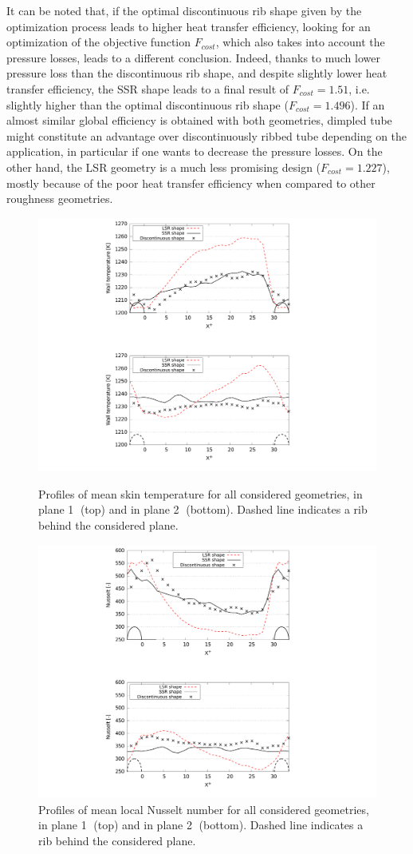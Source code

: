 It can be noted that, if the optimal discontinuous rib shape given by the optimization process leads to higher heat transfer efficiency, looking for an optimization of the objective function $F_{cost}$, which also takes into account the pressure losses, leads to a different conclusion. Indeed, thanks to much lower pressure loss than the discontinuous rib shape, and despite slightly lower heat transfer efficiency, the SSR shape leads to a final result of $F_{cost} = 1.51$, i.e. slightly higher than the optimal discontinuous rib shape ($F_{cost} = 1.496$). If an almost similar global efficiency is obtained with both geometries, dimpled tube might constitute an advantage over discontinuously ribbed tube depending on the application, in particular if one wants to decrease the pressure losses. On the other hand, the LSR geometry is a much less promising design ($F_{cost}=1.227$), mostly because of the poor heat transfer efficiency when compared to other roughness geometries.\\

\begin{figure}[h]
\begin{minipage}[c]{1.0\linewidth}
\centering
\includegraphics[width=0.55\linewidth]{fig/applications/optim/Twall_profile_compare.pdf}
\caption{Profiles of mean skin temperature for all considered geometries, in plane \textcircled{1} (top) and in plane \textcircled{2} (bottom). Dashed line indicates a rib behind the considered plane.}
\label{Twall_profile_compare}
\end{minipage}

\begin{minipage}[c]{1.0\linewidth}
\centering
\includegraphics[width=0.55\linewidth]{fig/applications/optim/Nusselt_compare.pdf}
\caption{Profiles of mean local Nusselt number for all considered geometries, in plane \textcircled{1} (top) and in plane \textcircled{2} (bottom). Dashed line indicates a rib behind the considered plane.}
\label{Nusselt_compare}
\end{minipage}
\end{figure}

